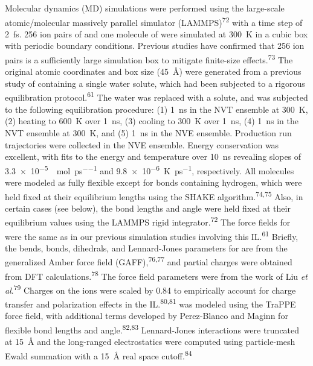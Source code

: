Molecular dynamics (MD) simulations were performed using the large-scale atomic/molecular massively parallel simulator (LAMMPS)\textsuperscript{72} with a time step of \SI{2}{\femto\second}. \num{256} ion pairs of \ce{[C4C1im][PF6]} and one molecule of  were simulated at \SI{300}{\kelvin} in a cubic box with periodic boundary conditions. Previous studies have confirmed that \num{256} ion pairs is a sufficiently large simulation box to mitigate finite-size effects.\textsuperscript{73} The original atomic coordinates and box size (\SI{45}{\angstrom}) were generated from a previous study of \ce{[C4C1im][PF6]} containing a single water solute, which had been subjected to a rigorous equilibration protocol.\textsuperscript{61} The water was replaced with a  solute, and was subjected to the following equilibration procedure: (1) \SI{1}{\nano\second} in the NVT ensemble at \SI{300}{\kelvin}, (2) heating to \SI{600}{\kelvin} over \SI{1}{\nano\second}, (3) cooling to \SI{300}{\kelvin} over \SI{1}{\nano\second}, (4) \SI{1}{\nano\second} in the NVT ensemble at \SI{300}{\kelvin}, and (5) \SI{1}{\nano\second} in the NVE ensemble. Production run trajectories were collected in the NVE ensemble. Energy conservation was excellent, with fits to the energy and temperature over \SI{10}{\nano\second} revealing slopes of \SI{3.3e-5}{\kcal\per\mole\per\pico\second} and \SI{9.8e-6}{\kelvin\per\pico\second}, respectively. All molecules were modeled as fully flexible except for bonds containing hydrogen, which were held fixed at their equilibrium lengths using the SHAKE algorithm.\textsuperscript{74,75} Also, in certain cases (see below), the  bond lengths and angle were held fixed at their equilibrium values using the LAMMPS rigid integrator.\textsuperscript{72} The force fields for \ce{[C4C1im][PF6]} were the same as in our previous simulation studies involving this IL.\textsuperscript{61} Briefly, the bends, bonds, dihedrals, and Lennard-Jones parameters for \ce{[C4C1im]+} are from the generalized Amber force field (GAFF),\textsuperscript{76,77} and partial charges were obtained from DFT calculations.\textsuperscript{78} The \ce{[PF6]-} force field parameters were from the work of Liu \emph{et al}.\textsuperscript{79} Charges on the ions were scaled by \num{0.84} to empirically account for charge transfer and polarization effects in the IL.\textsuperscript{80,81}  was modeled using the TraPPE force field, with additional terms developed by Perez-Blanco and Maginn for flexible bond lengths and angle.\textsuperscript{82,83} Lennard-Jones interactions were truncated at \SI{15}{\angstrom} and the long-ranged electrostatics were computed using particle-mesh Ewald summation with a \SI{15}{\angstrom} real space cutoff.\textsuperscript{84}

